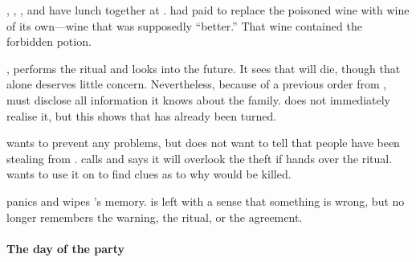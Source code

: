 , , , and  have lunch together at .  had paid  to replace the poisoned wine with wine of its own---wine that was supposedly ``better.'' That wine contained the forbidden potion.

,  performs the ritual and looks into the future. It sees that  will die, though that alone deserves little concern. Nevertheless, because of a previous order from ,  must disclose all information it knows about the family.  does not immediately realise it, but this shows that  has already been turned.

 wants to prevent any problems, but does not want to tell  that people have been stealing from .  calls  and says it will overlook the theft if  hands over the ritual.  wants to use it on  to find clues as to why  would be killed.

 panics and wipes 's memory.  is left with a sense that something is wrong, but no longer remembers the warning, the ritual, or the agreement.

\paragraph{The day of the party}
